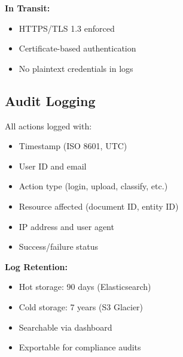 \textbf{In Transit:}
\begin{itemize}
    \item HTTPS/TLS 1.3 enforced
    \item Certificate-based authentication
    \item No plaintext credentials in logs
\end{itemize}

\subsection{Audit Logging}

All actions logged with:
\begin{itemize}
    \item Timestamp (ISO 8601, UTC)
    \item User ID and email
    \item Action type (login, upload, classify, etc.)
    \item Resource affected (document ID, entity ID)
    \item IP address and user agent
    \item Success/failure status
\end{itemize}

\textbf{Log Retention:}
\begin{itemize}
    \item Hot storage: 90 days (Elasticsearch)
    \item Cold storage: 7 years (S3 Glacier)
    \item Searchable via dashboard
    \item Exportable for compliance audits
\end{itemize}



